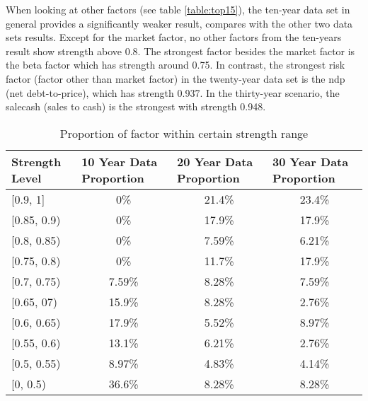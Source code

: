 When looking at other factors (see table \ref{table:top15}),  the ten-year data set in general provides a significantly weaker result, compares with the other two data sets results.
Except for the market factor, no other factors from the ten-years result show strength above 0.8.
The strongest factor besides the market factor is the beta factor which has strength around 0.75.
In contrast, the strongest risk factor (factor other than market factor) in the twenty-year data set is the ndp (net debt-to-price), which has strength 0.937.
In the thirty-year scenario, the salecash (sales to cash) is the strongest with strength 0.948.

\begin{table}[hbt!]
	\centering
	\caption{ Proportion of factor within certain strength range }\label{table:proportion}
	\begin{tabular}{lccc}
		\hline
		\hline
		Strength Level & \multicolumn{1}{l}{10 Year Data Proportion} & \multicolumn{1}{l}{20 Year Data Proportion} & \multicolumn{1}{l}{30 Year Data Proportion} \\ \hline
		{[}0.9, 1{]}   & 0\%                                         & 21.4\%                                      & 23.4\%                                         \\
		{[}0.85, 0.9)  & 0\%                                         & 17.9\%                                      & 17.9\%                                      \\
		{[}0.8, 0.85)  & 0\%                                         & 7.59\%                                      & 6.21\%                                      \\
		{[}0.75, 0.8)  & 0\%                                         & 11.7\%                                      & 17.9\%                                      \\
		{[}0.7, 0.75)  & 7.59\%                                      & 8.28\%                                      & 7.59\%                                      \\
		{[}0.65, 07)   & 15.9\%                                      & 8.28\%                                      & 2.76\%                                      \\
		{[}0.6, 0.65)  & 17.9\%                                      & 5.52\%                                      & 8.97\%                                      \\
		{[}0.55, 0.6)  & 13.1\%                                      & 6.21\%                                      & 2.76\%                                      \\
		{[}0.5, 0.55)  & 8.97\%                                      & 4.83\%                                      & 4.14\%                                      \\
		{[}0, 0.5)     & 36.6\%                                      & 8.28\%                                      & 8.28\%                                      \\ \hline\hline
	\end{tabular}
\end{table}

